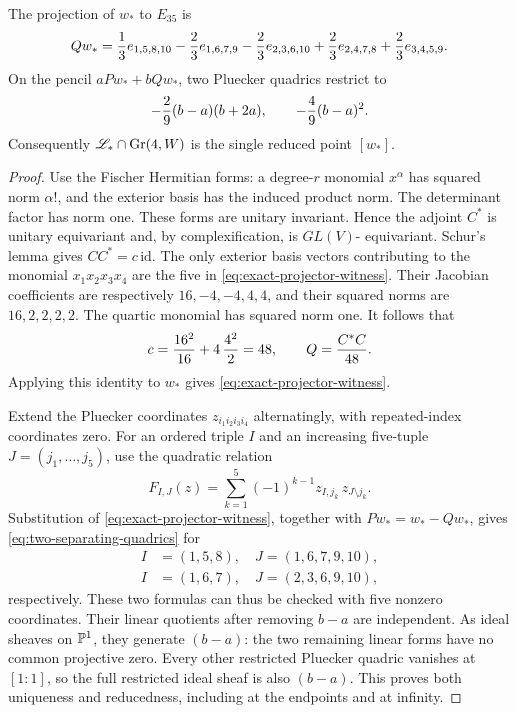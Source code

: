 \begin{lemma}
\label{lem:exact-plucker-pencil}
The projection of \(w_*\) to \(E_{35}\) is
\begin{equation}\label{eq:exact-projector-witness}
 Qw_*={1\over3}e_{1,5,8,10}
       -{2\over3}e_{1,6,7,9}
       -{2\over3}e_{2,3,6,10}
       +{2\over3}e_{2,4,7,8}
       +{2\over3}e_{3,4,5,9}.
\end{equation}
On the pencil \(aPw_*+bQw_*\), two Pluecker quadrics restrict to
\begin{equation}\label{eq:two-separating-quadrics}
 -{2\over9}(b-a)(b+2a),\qquad
 -{4\over9}(b-a)^2.
\end{equation}
Consequently \(\mathscr L_*\cap\operatorname{Gr}(4,W)\) is the single
reduced point \([w_*]\).
\end{lemma}
\begin{proof}
Use the Fischer Hermitian forms: a degree-\(r\) monomial
\(x^\alpha\) has squared norm \(\alpha!\), and the exterior
basis has the induced product norm.  The determinant factor has norm
one.  These forms are unitary invariant.  Hence the adjoint \(C^*\)
is unitary equivariant and, by complexification, is \(GL(V)\)-
equivariant.  Schur's lemma gives \(CC^*=c\,\mathrm{id}\).
The only exterior basis vectors contributing to the monomial
\(x_1x_2x_3x_4\) are the five in
\eqref{eq:exact-projector-witness}.  Their Jacobian coefficients
are respectively \(16,-4,-4,4,4\), and their squared norms are
\(16,2,2,2,2\).  The quartic monomial has squared norm one.
It follows that
\[
 c={16^2\over16}+4\,{4^2\over2}=48,
 \qquad Q={C^*C\over48}.
\]
Applying this identity to \(w_*\) gives
\eqref{eq:exact-projector-witness}.

Extend the Pluecker coordinates \(z_{i_1i_2i_3i_4}\)
alternatingly, with repeated-index coordinates zero.  For an ordered
triple \(I\) and an increasing five-tuple \(J=(j_1,\ldots,j_5)\),
use the quadratic relation
\[
 F_{I,J}(z)=\sum_{k=1}^5(-1)^{k-1}
              z_{I,j_k}\,z_{J\setminus j_k}.
\]
Substitution of \eqref{eq:exact-projector-witness}, together with
\(Pw_*=w_*-Qw_*\), gives \eqref{eq:two-separating-quadrics}
for
\[
 \begin{split}
 I&=(1,5,8),\quad J=(1,6,7,9,10),\\
 I&=(1,6,7),\quad J=(2,3,6,9,10),
 \end{split}
\]
respectively.  These two formulas can thus be checked with five
nonzero coordinates.  Their linear quotients after removing
\(b-a\) are independent.  As ideal sheaves on \(\mathbb P^1\),
they generate \((b-a)\): the two remaining linear forms have no
common projective zero.  Every other restricted Pluecker quadric
vanishes at \([1:1]\), so the full restricted ideal sheaf is also
\((b-a)\).  This proves both uniqueness and reducedness, including
at the endpoints and at infinity.
\end{proof}

